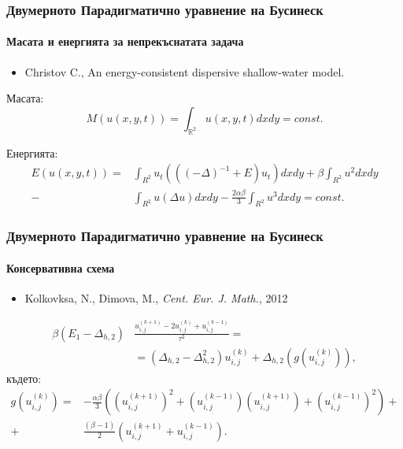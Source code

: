 \documentclass{beamer}
\newcommand{\RR}{\mathbb{R}}
\begin{document}
\begin{frame}
\frametitle{Двумерното Парадигматично уравнение на Бусинеск}
\framesubtitle{Масата и енергията за непрекъснатата задача }
\begin{itemize}
\item {\footnotesize Christov C., An energy-consistent dispersive shallow-water model.}
\end{itemize}
Масата:
\begin{equation}\label{intM}
M(u(x,y,t))=\int_{\RR^2} u(x,y,t)dx dy = const.
\end{equation}

Енергията:
\begin{align}\label{ex-en}
E(u(x,y,t)) = &\int_{R^2} u_t \left(((-\Delta)^{-1}+E)u_t\right) dxdy+
\beta \int_{R^2} u^2 dxdy \nonumber\\
-& \int_{R^2}u \left(\Delta u\right) dxdy
-\frac{2 \alpha \beta}{3} \int_{R^2} u^3 dxdy =const.
\end{align}

\end{frame}

\begin{frame}
\frametitle{Двумерното Парадигматично уравнение на Бусинеск}
\framesubtitle{Консервативна схема}
\begin{itemize}
\footnotesize
\item Kolkovksa, N., Dimova, M., {\it Cent. Eur. J. Math.}, 2012
\end{itemize}

\begin{align}\label{consFDS}
\beta (E_1-\Delta_{h,2})&\frac{ u^{(k+1)}_{i, j} - 2u^{(k)}_{i,j} + u^{(k-1)}_{i,j} }{\tau^2} =  \nonumber \\
&=(\Delta_{h,2} - \Delta_{h,2}^2)u^{(k)}_{i,j} + \Delta_{h,2}(g(u^{(k)}_{i,j})),
\end{align}
където:
\begin{align}
g(u^{(k)}_{i,j})=& -\frac{\alpha \beta} { 3 } \left( (u^{(k+1)}_{i,j})^2 + (u^{(k-1)}_{i,j})(u^{(k+1)}_{i,j}) + (u^{(k-1)}_{i,j})^2 \right) + \nonumber\\
+&\frac{ (\beta - 1 )}{ 2 }\left( u^{(k+1)}_{i,j} + u^{(k-1)}_{i,j} \right).
\end{align}
\end{frame}

\end{document}

